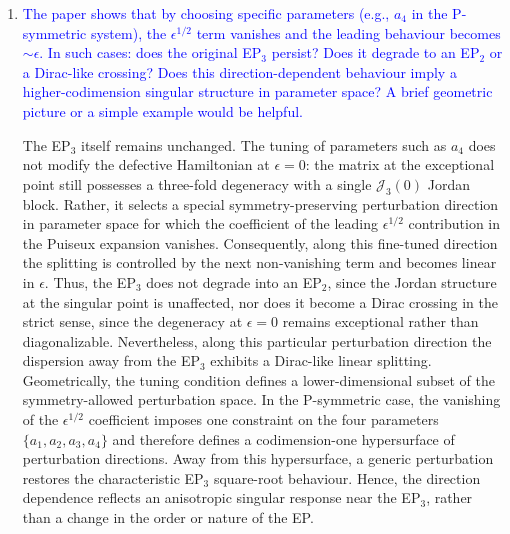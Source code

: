 \documentclass[aps,prb,onecolumn,nofootinbib,citeautoscript,10pt]{revtex4-2}
\begin{document}
\begin{enumerate}
\item \textcolor{blue}{The paper shows that by choosing specific parameters (e.g., $a_4$ in the P-symmetric system), the $\epsilon^{1/2}$ term vanishes and the leading behaviour becomes $\sim \epsilon$. In such cases: does the original EP$_3$ persist? Does it degrade to an EP$_2$ or a Dirac-like crossing? Does this direction-dependent behaviour imply a higher-codimension singular structure in parameter space? A brief geometric picture or a simple example would be helpful.}



The EP$_3$ itself remains unchanged. The tuning of parameters such as $a_4$ does not modify the defective Hamiltonian at $\epsilon=0$: the matrix at the exceptional point still possesses a three-fold degeneracy with a single $\mathcal{J}_3(0)$ Jordan block. Rather, it selects a special symmetry-preserving perturbation direction in parameter space for which the coefficient of the leading $\epsilon^{1/2}$ contribution in the Puiseux expansion vanishes. Consequently, along this fine-tuned direction the splitting is controlled by the next non-vanishing term and becomes linear in $\epsilon$.
Thus, the EP$_3$ does not degrade into an EP$_2$, since the Jordan structure at the singular point is unaffected, nor does it become a Dirac crossing in the strict sense, since the degeneracy at $\epsilon=0$ remains exceptional rather than diagonalizable. Nevertheless, along this particular perturbation direction the dispersion away from the EP$_3$ exhibits a Dirac-like linear splitting. Geometrically, the tuning condition defines a lower-dimensional subset of the symmetry-allowed perturbation space. In the P-symmetric case, the vanishing of the $\epsilon^{1/2}$ coefficient imposes one constraint on the four parameters $\{a_1,a_2,a_3,a_4\}$ and therefore defines a codimension-one hypersurface of perturbation directions. Away from this hypersurface, a generic perturbation restores the characteristic EP$_3$ square-root behaviour. Hence, the direction dependence reflects an anisotropic singular response near the EP$_3$, rather than a change in the order or nature of the EP.


\end{enumerate}
\end{document}
